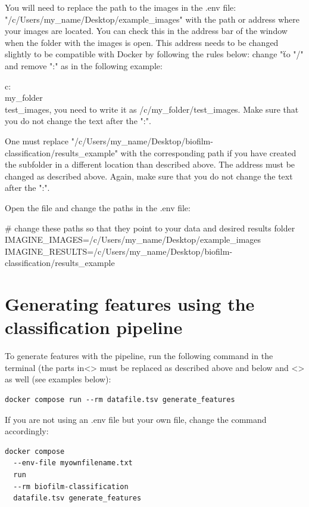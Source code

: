 \documentclass{ol-softwaremanual}
\begin{document}
You will need to replace the path to the images in the .env file: \\
"/c/Users/my\_name/Desktop/example\_images" with the path or address where your images are located. You can check this in the address bar of the window when the folder with the images is open. This address needs to be changed slightly to be compatible with Docker by following the rules below: change "\" to "/" and remove ":" as in the following example: 

c:\\my\_folder\\test\_images, you need to write it as /c/my\_folder/test\_images. Make sure that you do not change the text after the ":".

One must replace "/c/Users/my\_name/Desktop/biofilm-classification/results\_example" with the corresponding path if you have created the subfolder in a different location than described above. The address must be changed as described above. Again, make sure that you do not change the text after the ":".

Open the file and change the paths in the .env file:

\# change these paths so that they point to your data and desired results folder\\
IMAGINE\_IMAGES=/c/Users/my\_name/Desktop/example\_images\\
IMAGINE\_RESULTS=/c/Users/my\_name/Desktop/biofilm-classification/results\_example

\section{Generating features using the classification pipeline}

To generate features with the pipeline, run the following command in the terminal (the parts in<> must be replaced as described above and below and <> as well (see examples below):

\begin{verbatim}
docker compose run --rm datafile.tsv generate_features
\end{verbatim}

If you are not using an .env file but your own file, change the command accordingly:

\begin{verbatim}
docker compose 
  --env-file myownfilename.txt 
  run 
  --rm biofilm-classification
  datafile.tsv generate_features
\end{verbatim}
\end{document}
